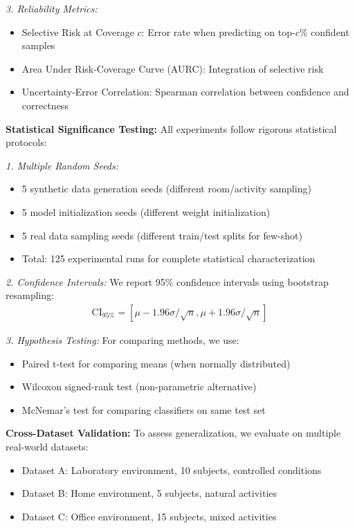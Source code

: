 \documentclass[journal]{IEEEtran}
\begin{document}
\textit{3. Reliability Metrics:}
\begin{itemize}
\item Selective Risk at Coverage $c$: Error rate when predicting on top-$c$\% confident samples
\item Area Under Risk-Coverage Curve (AURC): Integration of selective risk
\item Uncertainty-Error Correlation: Spearman correlation between confidence and correctness
\end{itemize}

\textbf{Statistical Significance Testing:}
All experiments follow rigorous statistical protocols:

\textit{1. Multiple Random Seeds:}
\begin{itemize}
\item 5 synthetic data generation seeds (different room/activity sampling)
\item 5 model initialization seeds (different weight initialization)
\item 5 real data sampling seeds (different train/test splits for few-shot)
\item Total: 125 experimental runs for complete statistical characterization
\end{itemize}

\textit{2. Confidence Intervals:}
We report 95\% confidence intervals using bootstrap resampling:
\begin{align}
\text{CI}_{95\%} = [\mu - 1.96\sigma/\sqrt{n}, \mu + 1.96\sigma/\sqrt{n}]
\end{align}

\textit{3. Hypothesis Testing:}
For comparing methods, we use:
\begin{itemize}
\item Paired t-test for comparing means (when normally distributed)
\item Wilcoxon signed-rank test (non-parametric alternative)
\item McNemar's test for comparing classifiers on same test set
\end{itemize}

\textbf{Cross-Dataset Validation:}
To assess generalization, we evaluate on multiple real-world datasets:
\begin{itemize}
\item Dataset A: Laboratory environment, 10 subjects, controlled conditions
\item Dataset B: Home environment, 5 subjects, natural activities
\item Dataset C: Office environment, 15 subjects, mixed activities
\end{itemize}
\end{document}
